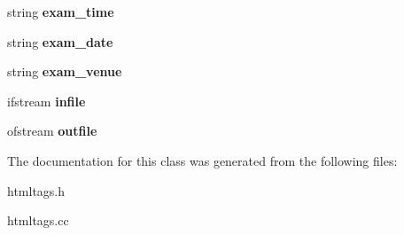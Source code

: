 \begin{DoxyCompactItemize}
\item 
\hypertarget{classHTMLTags_aec70fd316bcc9efb7c7b533e33ae4558}{string {\bfseries exam\-\_\-time}}\label{classHTMLTags_aec70fd316bcc9efb7c7b533e33ae4558}

\item 
\hypertarget{classHTMLTags_a151a26c12e98b0a76d9d9f1b5291b262}{string {\bfseries exam\-\_\-date}}\label{classHTMLTags_a151a26c12e98b0a76d9d9f1b5291b262}

\item 
\hypertarget{classHTMLTags_abcbead0e2f1104cfbac02b0f17aa4e96}{string {\bfseries exam\-\_\-venue}}\label{classHTMLTags_abcbead0e2f1104cfbac02b0f17aa4e96}

\item 
\hypertarget{classHTMLTags_ad72c63f88e720e8a23e457146d208578}{ifstream {\bfseries infile}}\label{classHTMLTags_ad72c63f88e720e8a23e457146d208578}

\item 
\hypertarget{classHTMLTags_a28fab1433a342a8862152c87959c03c3}{ofstream {\bfseries outfile}}\label{classHTMLTags_a28fab1433a342a8862152c87959c03c3}

\end{DoxyCompactItemize}


The documentation for this class was generated from the following files\-:\begin{DoxyCompactItemize}
\item 
htmltags.\-h\item 
htmltags.\-cc\end{DoxyCompactItemize}
